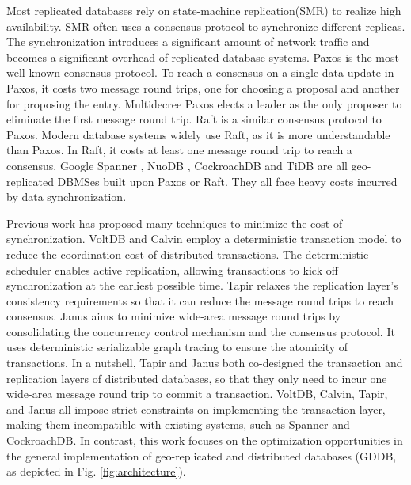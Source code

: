\documentclass[conference]{IEEEtran}
\begin{document}
Most replicated databases rely on state-machine replication(SMR) to realize high availability.
SMR often uses a consensus protocol to synchronize different replicas.
The synchronization introduces a significant amount of network traffic and becomes a significant overhead of replicated database systems.
Paxos \cite{Paxos:journals/tocs/Lamport98}\cite{PaxosSimple:conf/opodis/Lamport02} is the most well known consensus protocol.
To reach a consensus on a single data update in Paxos, it costs two message round trips, one for choosing a proposal and another for proposing the entry.
Multidecree Paxos\cite{Multidecree:journals/csur/RenesseA15} elects a leader as the only proposer to eliminate the first message round trip.
Raft\cite{Raft:conf/usenix/OngaroO14} is a similar consensus protocol to Paxos.
Modern database systems widely use Raft, as it is more understandable than Paxos.
In Raft, it costs at least one message round trip to reach a consensus.
Google Spanner \cite{Spanner:conf/osdi/CorbettDEFFFGGHHHKKLLMMNQRRSSTWW12}\cite{Spanner:conf/sigmod/BaconBBCDFFGJKL17},
NuoDB \cite{NuoDB}, CockroachDB \cite{CockroachDB} and TiDB \cite{TiDB} are all geo-replicated DBMSes built upon Paxos or Raft.
They all face heavy costs incurred by data synchronization.

Previous work has proposed many techniques
to minimize the cost of synchronization.
VoltDB \cite{VoltDB} and Calvin \cite{Calvin:conf/sigmod/ThomsonDWRSA12} employ a deterministic transaction model
to reduce the coordination cost of distributed transactions.
The deterministic scheduler enables active replication, allowing transactions to kick off synchronization at the earliest possible time.
Tapir \cite{Tapir:conf/sosp/ZhangSSKP15} relaxes the replication layer's consistency requirements so that it can reduce the message round trips to reach consensus.
Janus \cite{Janus:conf/osdi/MuNLL16} aims to minimize wide-area message round trips
by consolidating the concurrency control mechanism and the consensus protocol.
It uses deterministic serializable graph tracing to ensure the atomicity of transactions.
In a nutshell, Tapir and Janus both co-designed the transaction and replication layers of distributed databases, so that they only need to incur one wide-area message round trip to commit a transaction.
VoltDB, Calvin, Tapir, and Janus all impose strict constraints on implementing the transaction layer, making them incompatible with existing systems, such as Spanner and CockroachDB.
In contrast, this work focuses on the optimization opportunities in the general implementation of geo-replicated and distributed databases (GDDB, as depicted in Fig.    \ref{fig:architecture}).
\end{document}

